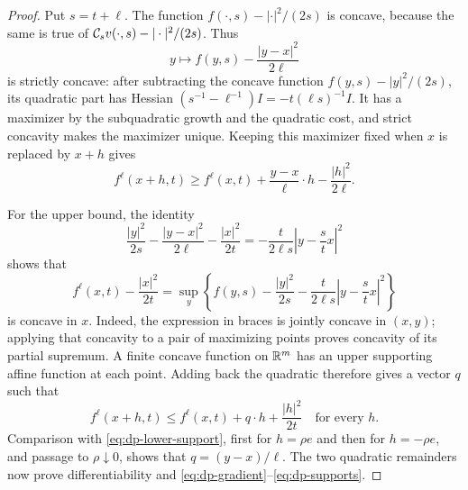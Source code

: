 \begin{proof}
Put $s=t+\ell$.  The function $f(\cdot,s)-|\cdot|^2/(2s)$ is concave,
because the same is true of $\mathcal{C}_s v(\cdot,s)-|\cdot|^2/(2s)$.  Thus
\[
  y\longmapsto f(y,s)-\frac{|y-x|^2}{2\ell}
\]
is strictly concave: after subtracting the concave function
$f(y,s)-|y|^2/(2s)$, its quadratic part has Hessian
$(s^{-1}-\ell^{-1})I=-t(\ell s)^{-1}I$.  It has a maximizer by the
subquadratic growth and the quadratic cost, and strict concavity makes the
maximizer unique.  Keeping this maximizer fixed when $x$ is replaced by
$x+h$ gives
\begin{equation}\label{eq:dp-lower-support}
  f^\ell(x+h,t)\ge f^\ell(x,t)+\frac{y-x}{\ell}\cdot h
                                      -\frac{|h|^2}{2\ell}.
\end{equation}

For the upper bound, the identity
\[
  \frac{|y|^2}{2s}-\frac{|y-x|^2}{2\ell}-\frac{|x|^2}{2t}
  =-\frac{t}{2\ell s}\left|y-\frac{s}{t}x\right|^2
\]
shows that
\[
  f^\ell(x,t)-\frac{|x|^2}{2t}
  =\sup_y\left\{f(y,s)-\frac{|y|^2}{2s}
                  -\frac{t}{2\ell s}\left|y-\frac{s}{t}x\right|^2\right\}
\]
is concave in $x$.  Indeed, the expression in braces is jointly concave in
$(x,y)$; applying that concavity to a pair of maximizing points proves
concavity of its partial supremum.  A finite concave function on $\mathbb{R}^m$ has
an upper supporting affine function at each point.  Adding back the
quadratic therefore gives a vector $q$ such that
\[
  f^\ell(x+h,t)\le f^\ell(x,t)+q\cdot h+\frac{|h|^2}{2t}
  \quad\text{for every }h.
\]
Comparison with \eqref{eq:dp-lower-support}, first for $h=\rho e$ and then
for $h=-\rho e$, and passage to $\rho\downarrow0$, shows that
$q=(y-x)/\ell$.  The two quadratic remainders now prove differentiability
and \eqref{eq:dp-gradient}--\eqref{eq:dp-supports}.
\end{proof}

